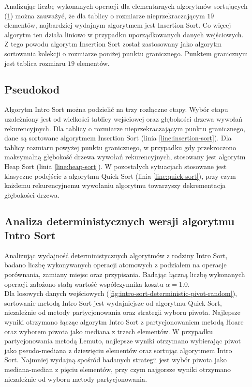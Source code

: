 Analizując liczbę wykonanych operacji dla elementarnych algorytmów sortujących (\ref{fig:sorting-small-array}) można zauważyć, że dla tablicy o rozmiarze nieprzekraczającym $19$ elementów, najbardziej wydajnym algorytmem jest Insertion Sort. Co więcej algorytm ten działa liniowo w przypadku uporządkowanych danych wejściowych. Z tego powodu algorytm Insertion Sort został zastosowany jako algorytm sortowania kolekcji o rozmiarze poniżej punktu granicznego. Punktem granicznym jest tablica rozmiaru $19$ elementów.\\

\begin{figure}[]
	\centering
	
	\caption[]{}
	\label{fig:sorting-small-array}
\end{figure}

\subsection{Pseudokod}
Algorytm Intro Sort można podzielić na trzy rozłączne etapy. Wybór etapu uzależniony jest od wielkości tablicy wejściowej oraz głębokości drzewa wywołań rekurencyjnych. Dla tablicy o rozmiarze nieprzekraczającym punktu granicznego, dane są sortowane algorytmem Insertion Sort (linia \ref{line:insertion-sort}). Dla tablicy rozmiaru powyżej punktu granicznego, w przypadku gdy przekroczono maksymalną głębokość drzewa wywołań rekurencyjnych, stosowany jest algorytm Heap Sort (linia \ref{line:heap-sort}). W pozostałych sytuacjach stosowane jest klasyczne podejście z algorytmu Quick Sort (linia \ref{line:quick-sort}), przy czym każdemu rekurencyjnemu wywołaniu algorytmu towarzyszy dekrementacja głębokości drzewa.



\subsection{Analiza deterministycznych wersji algorytmu Intro Sort}
Analizując wydajność deterministycznych algorytmów z rodziny Intro Sort, badano liczbę wykonywanych operacji atomowych z podziałem na operacje porównania, zamiany miejsc oraz przypisania. Badając łączną liczbę wykonanych operacji założono stałą wartość współczynnika kosztu $\alpha = 1.0$.\\

Dla losowych danych wejściowych (\ref{fig:intro-sort-deterministic-pivot-random}), sortowanie metodą Intro Sort jest wydajniejsze od algorytmu Quick Sort, niezależnie od metody partycjonowania oraz strategii wyboru piwota. Najlepsze wyniki otrzymano łącząc algorytm Intro Sort z partycjonowaniem metodą Hoare oraz wyborem piwota jako mediana z trzech elementów. W przypadku partycjonowania metodą Lemuto, najlepsze wyniki otrzymano wybierając piwot jako pseudo-mediana z dziewięciu elementów oraz sortując algorytmem Intro Sort. Najmniej wydajną spośród badanych strategii jest wybór piwota jako mediana-median z pięciu elementów, przy czym najgorsze wyniki otrzymano niezależnie od wyboru metody partycjonowania.\\

